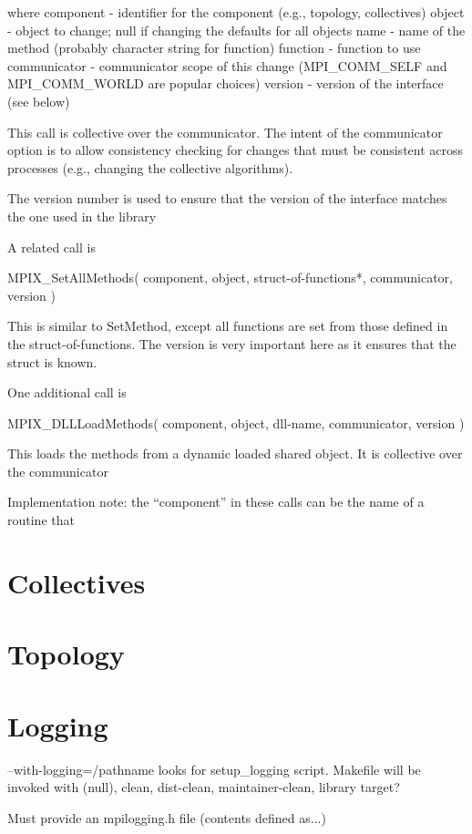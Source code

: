 \documentclass{report}
\begin{document}
where
    component - identifier for the component (e.g., topology,
    collectives)
    object    - object to change; null if changing the defaults for
    all objects
    name      - name of the method (probably character string for function)
    function  - function to use
    communicator - communicator scope of this change (MPI_COMM_SELF
    and MPI_COMM_WORLD are popular choices)
    version   - version of the interface (see below)

    This call is collective over the communicator.  The intent of the 
    communicator option is to allow consistency checking for changes
    that must be consistent across processes (e.g., changing the
    collective algorithms).

    The version number is used to ensure that the version of the
    interface matches the one used in the library

A related call is

    MPIX_SetAllMethods( component, object, struct-of-functions*,
    communicator, version )

This is similar to SetMethod, except all functions are set from those
defined in the struct-of-functions.  The version is very important
here as it ensures that the struct is known.

One additional call is

    MPIX_DLLLoadMethods( component, object, dll-name, communicator,
    version )

This loads the methods from a dynamic loaded shared object.  It is
collective over the communicator

Implementation note: the ``component'' in these calls can be the name
of a routine that 

\section{Collectives}
\section{Topology}
\section{Logging}
    --with-logging=/pathname
    looks for setup_logging script.  Makefile will be invoked with (null),
    clean, dist-clean, maintainer-clean, library target?

    Must provide an mpilogging.h file (contents defined as...)
\end{document}

